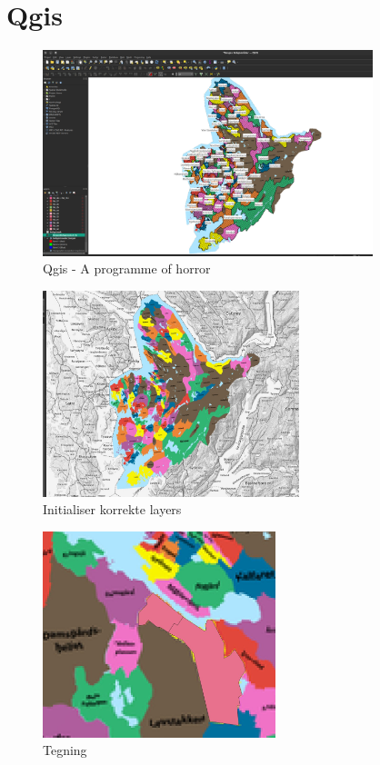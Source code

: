 \section{Qgis}
\begin{frame}
    \begin{figure}
        \centering
        \includegraphics[height = 6cm]{images/qgisOverview.png}%
        \caption{Qgis - A programme of horror}
    \end{figure}
\end{frame}

\begin{frame}
    \begin{figure}
        \centering
        \includegraphics[height = 6cm]{images/qgis1.jpg}%
        \caption{Initialiser korrekte layers}
    \end{figure}
\end{frame}

\begin{frame}
    \begin{figure}
        \centering
        \includegraphics[height = 6cm]{images/qgis2.png}%
        \caption{Tegning}
    \end{figure}
\end{frame}

